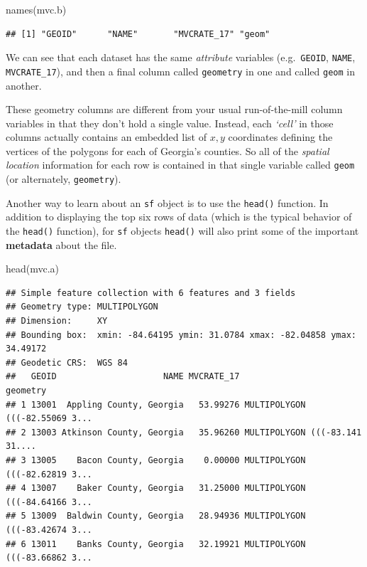 \documentclass[
]{book}
\newenvironment{Shaded}{\begin{snugshade}}{\end{snugshade}}
\newcommand{\FunctionTok}[1]{\textcolor[rgb]{0.00,0.00,0.00}{#1}}
\newcommand{\NormalTok}[1]{#1}
\begin{document}
\begin{Shaded}
\begin{Highlighting}[]
\FunctionTok{names}\NormalTok{(mvc.b)}
\end{Highlighting}
\end{Shaded}

\begin{verbatim}
## [1] "GEOID"      "NAME"       "MVCRATE_17" "geom"
\end{verbatim}

We can see that each dataset has the same \emph{attribute} variables (e.g.~\texttt{GEOID}, \texttt{NAME}, \texttt{MVCRATE\_17}), and then a final column called \texttt{geometry} in one and called \texttt{geom} in another.

These geometry columns are different from your usual run-of-the-mill column variables in that they don't hold a single value. Instead, each \emph{`cell'} in those columns actually contains an embedded list of \(x,y\) coordinates defining the vertices of the polygons for each of Georgia's counties. So all of the \emph{spatial location} information for each row is contained in that single variable called \texttt{geom} (or alternately, \texttt{geometry}).

Another way to learn about an \texttt{sf} object is to use the \texttt{head()} function. In addition to displaying the top six rows of data (which is the typical behavior of the \texttt{head()} function), for \texttt{sf} objects \texttt{head()} will also print some of the important \textbf{metadata} about the file.

\begin{Shaded}
\begin{Highlighting}[]
\FunctionTok{head}\NormalTok{(mvc.a)}
\end{Highlighting}
\end{Shaded}

\begin{verbatim}
## Simple feature collection with 6 features and 3 fields
## Geometry type: MULTIPOLYGON
## Dimension:     XY
## Bounding box:  xmin: -84.64195 ymin: 31.0784 xmax: -82.04858 ymax: 34.49172
## Geodetic CRS:  WGS 84
##   GEOID                     NAME MVCRATE_17                       geometry
## 1 13001  Appling County, Georgia   53.99276 MULTIPOLYGON (((-82.55069 3...
## 2 13003 Atkinson County, Georgia   35.96260 MULTIPOLYGON (((-83.141 31....
## 3 13005    Bacon County, Georgia    0.00000 MULTIPOLYGON (((-82.62819 3...
## 4 13007    Baker County, Georgia   31.25000 MULTIPOLYGON (((-84.64166 3...
## 5 13009  Baldwin County, Georgia   28.94936 MULTIPOLYGON (((-83.42674 3...
## 6 13011    Banks County, Georgia   32.19921 MULTIPOLYGON (((-83.66862 3...
\end{verbatim}
\end{document}

